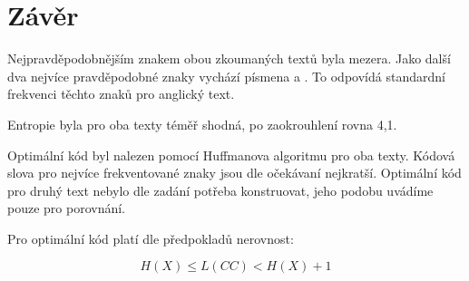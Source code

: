 \documentclass[12pt]{article}
\begin{document}
   	\section{Závěr}\label{z}
   		Nejpravděpodobnějším znakem obou zkoumaných textů byla mezera. Jako další dva nejvíce pravděpodobné znaky vychází písmena  a . To odpovídá standardní frekvenci těchto znaků pro anglický text.
   		
   		Entropie byla pro oba texty téměř shodná, po zaokrouhlení rovna 4,1.
   		
   		Optimální kód byl nalezen pomocí Huffmanova algoritmu pro oba texty. Kódová slova pro nejvíce frekventované znaky jsou dle očekávaní nejkratší. Optimální kód pro druhý text nebylo dle zadání potřeba konstruovat, jeho podobu uvádíme pouze pro porovnání.
   		
   		Pro optimální kód platí dle předpokladů nerovnost:
   		
   		$$ H(X) \leq L(CC) < H(X) + 1 $$
   		
   		
   		
\end{document}
